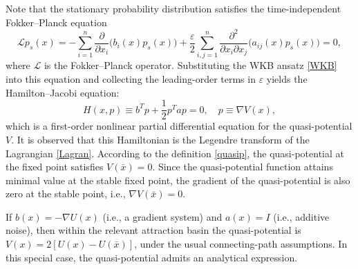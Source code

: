 \documentclass[11pt]{article}
\theoremstyle{plain}      %
\theoremstyle{definition} %
\begin{document}
Note that the stationary probability distribution satisfies the time-independent Fokker--Planck equation 
\[ \mathcal{L}p_s(x) = - \sum_{i=1}^n \frac{\partial}{\partial x_i}\bigl(b_i(x)p_{s}(x)\bigr) + \frac{\varepsilon}{2}\sum_{i,j=1}^n \frac{\partial^2}{\partial x_i \partial x_j}\bigl(a_{ij}(x)p_{s}(x)\bigr) = 0, \]
where \( \mathcal{L} \) is the Fokker--Planck operator. Substituting the WKB ansatz \eqref{WKB} into this equation and collecting the leading-order terms in \( \varepsilon \) yields the Hamilton--Jacobi equation:
\begin{equation}
\label{HJE}
H(x, p) \equiv b^{T}p + \frac{1}{2} p^{T}ap = 0, \quad p \equiv \nabla V (x),
\end{equation}
which is a first-order nonlinear partial differential equation for the quasi-potential \( V \). It is observed that this Hamiltonian is the Legendre transform of the Lagrangian \eqref{Lagran}. According to the definition \eqref{quasip}, the quasi-potential at the fixed point satisfies \( V(\bar{x}) = 0 \). Since the quasi-potential function attains minimal value at the stable fixed point, the gradient of the quasi-potential is also zero at the stable point, i.e., $\nabla V(\bar{x}) =0$.

If \( b(x) = -\nabla U(x) \) (i.e., a gradient system) and \( a(x) = I \) (i.e., additive noise), then within the relevant attraction basin the quasi-potential is \(V(x)=2[U(x)-U(\bar x)]\), under the usual connecting-path assumptions. In this special case, the quasi-potential admits an analytical expression.
\end{document}
